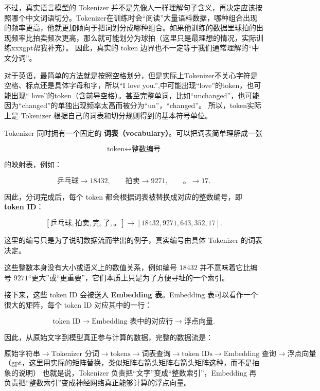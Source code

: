 \documentclass[UTF8,11pt,a4paper]{ctexart}
\begin{document}
不过，真实语言模型的 Tokenizer 并不是先像人一样理解句子含义，再决定应该按照哪个中文词语切分。Tokenizer在训练时会“阅读”大量语料数据，哪种组合出现的频率更高，他就更加倾向于把词划分成哪种组合。如果他训练的数据里球拍的出现频率比拍卖频次更高，那么就可能划分为球拍（这里只是最理想的情况，实际训练xxxgpt帮我补充）。
因此，真实的 token 边界也不一定等于我们通常理解的“中文分词”。

对于英语，最简单的方法就是按照空格划分，但是实际上Tokenizer不关心字符是空格、标点还是具体字母和字，所以“I love you.”,中可能出现“love”的token，也可能出现“ love”的token（含前导空格）。甚至完整单词，比如“unchanged”，也可能因为“changed”的单独出现频率太高而被分为“un”，“changed”。
所以，token实际上是 Tokenizer 根据自己的词表和切分规则得到的基本符号单位。

Tokenizer 同时拥有一个固定的 \textbf{词表（vocabulary）}。可以把词表简单理解成一张

\[
\text{token}\longleftrightarrow\text{整数编号}
\]

的映射表，例如：

\[
\texttt{乒乓球}\rightarrow18432,\qquad
\texttt{拍卖}\rightarrow9271,\qquad
\texttt{。}\rightarrow17.
\]

因此，分词完成后，每个 token 都会根据词表被替换成对应的整数编号，即 \textbf{token ID}：

\[
[\texttt{乒乓球},\texttt{拍卖},\texttt{完},
\texttt{了},\texttt{。}]
\longrightarrow
[18432,9271,643,352,17].
\]

这里的编号只是为了说明数据流而举出的例子，真实编号由具体 Tokenizer 的词表决定。

这些整数本身没有大小或语义上的数值关系，例如编号 \(18432\) 并不意味着它比编号 \(9271\)“更大”或“更重要”，它们本质上只是为了方便寻址的一个索引。

接下来，这些 token ID 会被送入 \textbf{Embedding 表}。Embedding 表可以看作一个很大的矩阵，每个 token ID 对应其中的一行：

\[
\text{token ID}
\longrightarrow
\text{Embedding 表中的对应行}
\longrightarrow
\text{浮点向量}.
\]

因此，从原始文字到模型真正参与计算的数据，完整的数据流是：

\[
\boxed{
\text{原始字符串}
\rightarrow
\text{Tokenizer 分词}
\rightarrow
\text{tokens}
\rightarrow
\text{词表查询}
\rightarrow
\text{token IDs}
\rightarrow
\text{Embedding 查询}
\rightarrow
\text{浮点向量}
}
\]
（gpt，这里用实际的矩阵替换，类似矩阵右箭头矩阵右箭头矩阵这种，而不是抽象的说明）
也就是说，Tokenizer 负责把“文字”变成“整数索引”，Embedding 再负责把“整数索引”变成神经网络真正能够计算的浮点向量。
\end{document}
